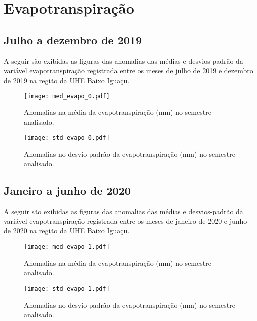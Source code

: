 \documentclass[a4paper,12pt]{article}
\begin{document}
        \newpage

        \section{Evapotranspiração }
        \subsection{Julho a dezembro de 2019}
        \hspace{0.5cm} A seguir são exibidas as figuras das anomalias das médias e desvios-padrão da variável evapotranspiração
        registrada entre os meses de julho de 2019 e dezembro de 2019 na região da UHE Baixo Iguaçu.

        \begin{figure}[!htb]
        \centering
        \texttt{[image: med\_evapo\_0.pdf]}
        \caption{Anomalias na média da evapotranspiração (mm) no semestre analisado.}
        \label{fig:figmed_evapo_0}
        \end{figure}

        \begin{figure}[!htb]
        \centering
        \texttt{[image: std\_evapo\_0.pdf]}
        \caption{Anomalias no desvio padrão da evapotranspiração (mm) no semestre analisado.}
        \label{fig:figstd_evapo_0}
        \end{figure}

        \newpage
        \subsection{Janeiro a junho de 2020}
        \hspace{0.5cm} A seguir são exibidas as figuras das anomalias das médias e desvios-padrão da variável evapotranspiração
        registrada entre os meses de janeiro de 2020 e junho de 2020 na região da UHE Baixo Iguaçu.

        \begin{figure}[!htb]
        \centering
        \texttt{[image: med\_evapo\_1.pdf]}
        \caption{Anomalias na média da evapotranspiração (mm) no semestre analisado.}
        \label{fig:figmed_evapo_1}
        \end{figure}

        \begin{figure}[!htb]
        \centering
        \texttt{[image: std\_evapo\_1.pdf]}
        \caption{Anomalias no desvio padrão da evapotranspiração (mm) no semestre analisado.}
        \label{fig:figstd_evapo_1}
        \end{figure}
\end{document}
